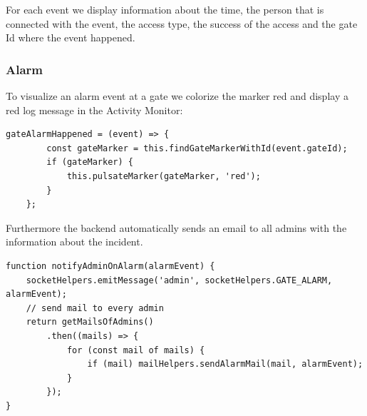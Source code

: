 For each event we display information about the time, the person that is connected with the event, the access type, the success of the access and the gate Id where the event happened.

\subsubsection{Alarm}

To visualize an alarm event at a gate we colorize the marker red and display a red log message in the Activity Monitor:

\begin{lstlisting}[label=alarmEventHappened]
gateAlarmHappened = (event) => {
        const gateMarker = this.findGateMarkerWithId(event.gateId);
        if (gateMarker) {
            this.pulsateMarker(gateMarker, 'red');
        }
    };
\end{lstlisting}

Furthermore the backend automatically sends an email to all admins with the information about the incident.

\begin{lstlisting}[label=notifyOnAlarm]
function notifyAdminOnAlarm(alarmEvent) {
    socketHelpers.emitMessage('admin', socketHelpers.GATE_ALARM, alarmEvent);
    // send mail to every admin
    return getMailsOfAdmins()
        .then((mails) => {
            for (const mail of mails) {
                if (mail) mailHelpers.sendAlarmMail(mail, alarmEvent);
            }
        });
}
\end{lstlisting}

\clearpage
